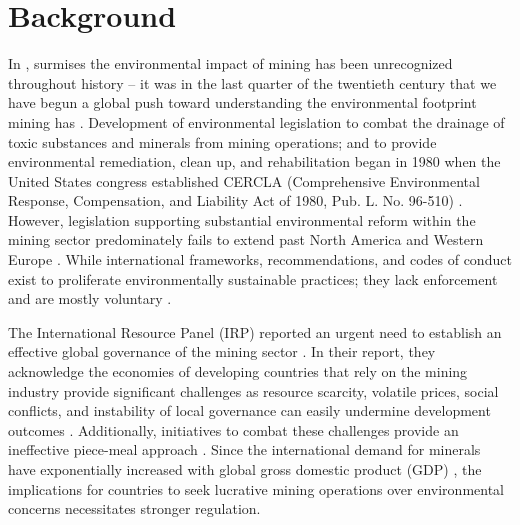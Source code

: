 \documentclass[12pt]{article}
\begin{document}
\section{Background}
In , \citeauthor{Article:Mining_Industry} surmises the environmental impact of mining has been unrecognized throughout history -- it was in the last quarter of the twentieth century that we have begun a global push toward understanding the environmental footprint mining has \cite{Article:Mining_Industry}. Development of environmental legislation to combat the drainage of toxic substances and minerals from mining operations; and to provide environmental remediation, clean up, and rehabilitation began in 1980 when the United States congress established CERCLA (Comprehensive Environmental Response, Compensation, and Liability Act of 1980, Pub. L. No. 96-510) \cite{Article:Mining_Industry}. However, legislation supporting substantial environmental reform within the mining sector predominately fails to extend past North America and Western Europe \cite{Article:Mining_Industry}. While international frameworks, recommendations, and codes of conduct exist to proliferate environmentally sustainable practices; they lack enforcement and are mostly voluntary \cite{Book:Governance_Resources}.

The International Resource Panel (IRP) reported an urgent need to establish an effective global governance of the mining sector \cite{Book:MRG_Sustainable_Report}. In their report, they acknowledge the economies of developing countries that rely on the mining industry provide significant challenges as resource scarcity, volatile prices, social conflicts, and instability of local governance can easily undermine development outcomes \cite{Book:MRG_Sustainable_Report}. Additionally, initiatives to combat these challenges provide an ineffective piece-meal approach \cite{Book:MRG_Sustainable_Report}. Since the international demand for minerals have exponentially increased with global gross domestic product (GDP) \cite{Article:Mining_Industry, Book:Governance_Resources, Book:MRG_Sustainable_Report}, the implications for countries to seek lucrative mining operations over environmental concerns necessitates stronger regulation. 
\end{document}

